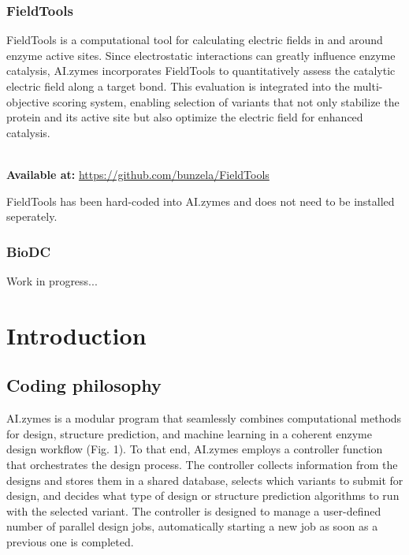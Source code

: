 \documentclass[10pt]{extarticle}
\let\oldsection\section
\renewcommand{\section}[1]{\clearpage\oldsection{#1}}
\begin{document}
\subsubsection{FieldTools}

FieldTools is a computational tool for calculating electric fields in and around enzyme active sites. Since electrostatic interactions can greatly influence enzyme catalysis, AI.zymes incorporates FieldTools to quantitatively assess the catalytic electric field along a target bond. This evaluation is integrated into the multi-objective scoring system, enabling selection of variants that not only stabilize the protein and its active site but also optimize the electric field for enhanced catalysis.

\\ \textbf{Available at:} \href{https://github.com/bunzela/FieldTools}{https://github.com/bunzela/FieldTools}

\begin{tcolorbox}[colback=mpgAccentBlue!20!white,colframe=mpgAccentBlue!80!black,title=Note]
FieldTools has been hard-coded into AI.zymes and does not need to be installed seperately.
\end{tcolorbox}

\subsubsection{BioDC}

Work in progress...\section{Introduction}
\subsection{Coding philosophy}
AI.zymes is a modular program that seamlessly combines computational methods for design, structure prediction, and machine learning in a coherent enzyme design workflow (Fig. 1). To that end, AI.zymes employs a controller function that orchestrates the design process. The controller collects information from the designs and stores them in a shared database, selects which variants to submit for design, and decides what type of design or structure prediction algorithms to run with the selected variant. The controller is designed to manage a user-defined number of parallel design jobs, automatically starting a new job as soon as a previous one is completed. 
 
\end{document}

